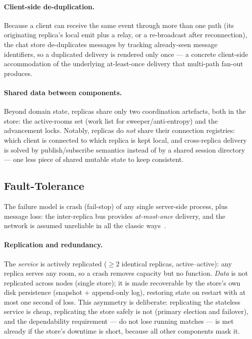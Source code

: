 \documentclass{scrartcl}
\begin{document}
\paragraph{Client-side de-duplication.}
Because a client can receive the same event through more than one path (its
originating replica's local emit plus a relay, or a re-broadcast after
reconnection), the chat store de-duplicates messages by tracking already-seen
message identifiers, so a duplicated delivery is rendered only once --- a
concrete client-side accommodation of the underlying at-least-once delivery that
multi-path fan-out produces.

\paragraph{Shared data between components.}
Beyond domain state, replicas share only two coordination artefacts, both in the
store: the active-rooms set (work list for sweeper/anti-entropy) and the
advancement locks. Notably, replicas do \emph{not} share their connection
registries: which client is connected to which replica is kept local, and
cross-replica delivery is solved by publish/subscribe semantics instead of by a
shared session directory --- one less piece of shared mutable state to keep
consistent.

\subsection{Fault-Tolerance}\label{fault-tolerance}

The failure model is crash (fail-stop) of any single server-side process, plus
message loss: the inter-replica bus provides \emph{at-most-once} delivery, and
the network is assumed unreliable in all the classic
ways~\cite{rotem2006fallacies}.

\paragraph{Replication and redundancy.}
The \emph{service} is actively replicated ($\geq 2$ identical replicas,
active--active): any replica serves any room, so a crash removes capacity but no
function. \emph{Data} is not replicated across nodes (single store); it is made
recoverable by the store's own disk persistence (snapshot + append-only log),
restoring state on restart with at most one second of loss. This asymmetry is
deliberate: replicating the stateless service is cheap, replicating the store
safely is not (primary election and failover), and the dependability requirement
--- do not lose running matches --- is met already if the store's downtime is
short, because all other components mask it.
\end{document}
